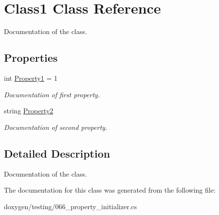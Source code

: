 \hypertarget{class_class1}{}\section{Class1 Class Reference}
\label{class_class1}


Documentation of the class.  


\subsection*{Properties}
\begin{DoxyCompactItemize}
\item 
\mbox{\label{class_class1_a6b0b2ab73516e37adb38b8ff33f97c40}} 
int \mbox{\hyperlink{class_class1_a6b0b2ab73516e37adb38b8ff33f97c40}{Property1}} = 1
\begin{DoxyCompactList}\small\item\em Documentation of first property. \end{DoxyCompactList}\item 
\mbox{\label{class_class1_a0d5b843d48ebc2c078e003d6ff3a1610}} 
string \mbox{\hyperlink{class_class1_a0d5b843d48ebc2c078e003d6ff3a1610}{Property2}}
\begin{DoxyCompactList}\small\item\em Documentation of second property. \end{DoxyCompactList}\end{DoxyCompactItemize}


\subsection{Detailed Description}
Documentation of the class. 

The documentation for this class was generated from the following file\+:\begin{DoxyCompactItemize}
\item 
doxygen/testing/066\+\_\+property\+\_\+initializer.\+cs\end{DoxyCompactItemize}
